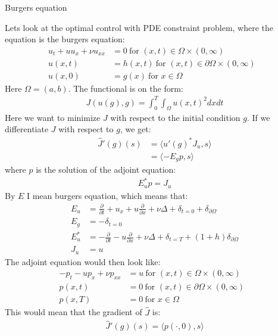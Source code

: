\documentclass[11pt,a4paper]{report}
\begin{document}
\begin{center}

\LARGE Burgers equation


\end{center}
Lets look at the optimal control with PDE constraint problem, where the equation is the burgers equation:
\begin{align*}
u_t + uu_x + \nu u_{xx} &= 0 \ \text{for $(x,t)\in \Omega\times(0,\infty)$}\\
u(x,t) &= h(x,t) \ \text{for $(x,t) \in\partial\Omega\times(0,\infty)$ } \\
u(x,0) &= g(x) \ \text{for $x \in\Omega$ }
\end{align*} 
Here $\Omega = (a,b)$. The functional is on the form:
\begin{align*}
J(u(g),g) = \int_0^T\int_{\Omega} u(x,t)^2 dxdt
\end{align*}
Here we want to minimize $J$ with respect to the initial condition $g$. If we differentiate $J$ with respect to $g$, we get:
\begin{align*}
\hat{J}'(g)(s) &= \langle u'(g)^*J_u,s \rangle \\
&= \langle -E_gp,s \rangle
\end{align*}
where $p$ is the solution of the adjoint equation:
\begin{align*}
E_u^*p = J_u
\end{align*}
By $E$ I mean burgers equation, which means that:
\begin{align*}
E_u &= \frac{\partial}{\partial t} + u_x + u\frac{\partial}{\partial x} + \nu\Delta + \delta_{t=0} + \delta_{\partial \Omega} \\
E_g &= -\delta_{t=0} \\
E_u^* &= -\frac{\partial}{\partial t}  -u\frac{\partial}{\partial x}+ \nu\Delta + \delta_{t=T} + (1+h)\delta_{\partial \Omega} \\
J_u &= u
\end{align*}
The adjoint equation would then look like:
\begin{align*}
-p_t -up_x + \nu p_{xx} &= u \ \text{for $(x,t)\in \Omega\times(0,\infty)$}\\
p(x,t) &= 0 \ \text{for $(x,t) \in\partial\Omega\times(0,\infty)$ } \\
p(x,T) &= 0 \ \text{for $x \in\Omega$ }
\end{align*}
This would mean that the gradient of $\hat{J}$ is:
\begin{align*}
\hat{J}'(g)(s) = \langle p(\cdot,0), s\rangle
\end{align*}
\end{document}
